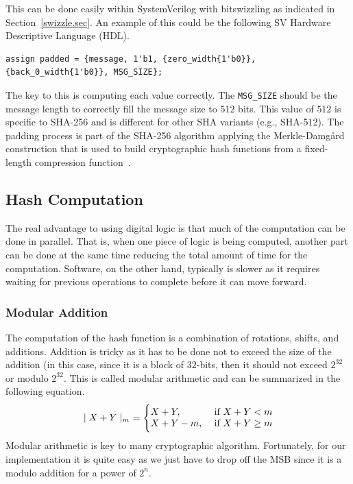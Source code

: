 \documentclass{article}
\begin{document}
This can be done easily within SystemVerilog with bitswizzling as
indicated in Section~\ref{swizzle.sec}.
An example of this could be the following SV Hardware Descriptive
Language (HDL).
\begin{verbatim}
assign padded = {message, 1'b1, {zero_width{1'b0}},  {back_0_width{1'b0}}, MSG_SIZE};
\end{verbatim}
The key to this is computing each value correctly.  The
\verb!MSG_SIZE! should be the message length to correctly fill the
message size to $512$ bits.  This value of $512$ is specific to
SHA-256 and is different for other SHA variants (e.g., SHA-512).  The
padding process is part of the SHA-256 algorithm applying the
Merkle-Damg{\aa}rd construction that is used to build cryptographic hash functions
from a fixed-length compression function~\cite{10.5555/1721909}.


\subsection{Hash Computation}

The real advantage to using digital logic is that much of the
computation can be done in parallel.  That is, when one piece of logic
is being computed, another part can be done at the same time reducing
the total amount of time for the computation.  Software, on the other
hand, typically is slower as it requires waiting for previous
operations to complete before it can move forward.

\subsubsection{Modular Addition}
\label{modular.sec}

The computation of the hash function is a combination of rotations,
shifts, and additions.  Addition is tricky as it has to be done not to
exceed the size of the addition (in this case, since it is a block of
$32$-bits, then it should not exceed $2^{32}$ or modulo $2^{32}$.  This is
called modular arithmetic and can be summarized in the following equation.
\begin{eqnarray*}
  \mid X+Y \mid_m ~= \Biggl\{
   \begin{array}{@{}ll@{}}
      X+Y,      & \text{ if $X+Y < m$}  \\
      X+Y-m,    & \text{ if $X+Y \geq m$} 
   \end{array}
\end{eqnarray*}  
Modular arithmetic is key to many cryptographic algorithm.
Fortunately, for our implementation it is quite easy as we just have
to drop off the MSB since it is a modulo addition for a power of $2^n$.
\end{document}
